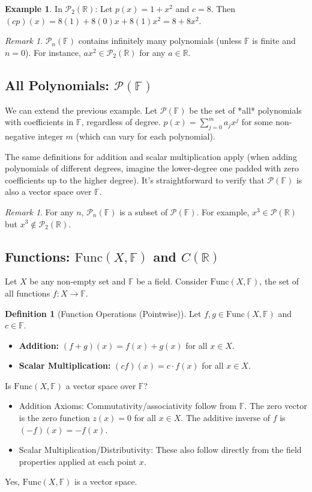 \documentclass[11pt]{article}
\theoremstyle{definition}
\newtheorem{definition}[theorem]{Definition}
\newtheorem{example}[theorem]{Example}
\theoremstyle{remark}
\newtheorem{remark}[theorem]{Remark}
\newcommand{\R}{\mathbb{R}}
\newcommand{\F}{\mathbb{F}} %
\newcommand{\Poly}[1]{\mathcal{P}(#1)}
\newcommand{\PolyN}[2]{\mathcal{P}_{#1}(#2)}
\newcommand{\Func}[2]{\mathrm{Func}(#1, #2)}
\begin{document}
\begin{example}
In $\PolyN{2}{\R}$: Let $p(x) = 1+x^2$ and $c=8$.
Then $(c p)(x) = 8(1) + 8(0)x + 8(1)x^2 = 8 + 8x^2$.
\end{example}

\begin{remark}
$\PolyN{n}{\F}$ contains infinitely many polynomials (unless $\F$ is finite and $n=0$). For instance, $ax^2 \in \PolyN{2}{\R}$ for any $a \in \R$.
\end{remark}

\subsection{All Polynomials: $\Poly{\F}$}
We can extend the previous example. Let $\Poly{\F}$ be the set of *all* polynomials with coefficients in $\F$, regardless of degree.
$p(x) = \sum_{j=0}^m a_j x^j$ for some non-negative integer $m$ (which can vary for each polynomial).

The same definitions for addition and scalar multiplication apply (when adding polynomials of different degrees, imagine the lower-degree one padded with zero coefficients up to the higher degree). It's straightforward to verify that $\Poly{\F}$ is also a vector space over $\F$.

\begin{remark}
For any $n$, $\PolyN{n}{\F}$ is a subset of $\Poly{\F}$. For example, $x^3 \in \Poly{\R}$ but $x^3 \notin \PolyN{2}{\R}$.
\end{remark}

\subsection{Functions: $\Func{X}{\F}$ and $C(\R)$}
Let $X$ be any non-empty set and $\F$ be a field. Consider $\Func{X}{\F}$, the set of all functions $f: X \to \F$.

\begin{definition}[Function Operations (Pointwise)]
Let $f, g \in \Func{X}{\F}$ and $c \in \F$.
\begin{itemize}
    \item \textbf{Addition:} $(f+g)(x) = f(x) + g(x)$ for all $x \in X$.
    \item \textbf{Scalar Multiplication:} $(c f)(x) = c \cdot f(x)$ for all $x \in X$.
\end{itemize}
\end{definition}

Is $\Func{X}{\F}$ a vector space over $\F$?
\begin{itemize}
    \item Addition Axioms: Commutativity/associativity follow from $\F$. The zero vector is the zero function $z(x) = 0$ for all $x \in X$. The additive inverse of $f$ is $(-f)(x) = -f(x)$.
    \item Scalar Multiplication/Distributivity: These also follow directly from the field properties applied at each point $x$.
\end{itemize}
Yes, $\Func{X}{\F}$ is a vector space.
\end{document}
